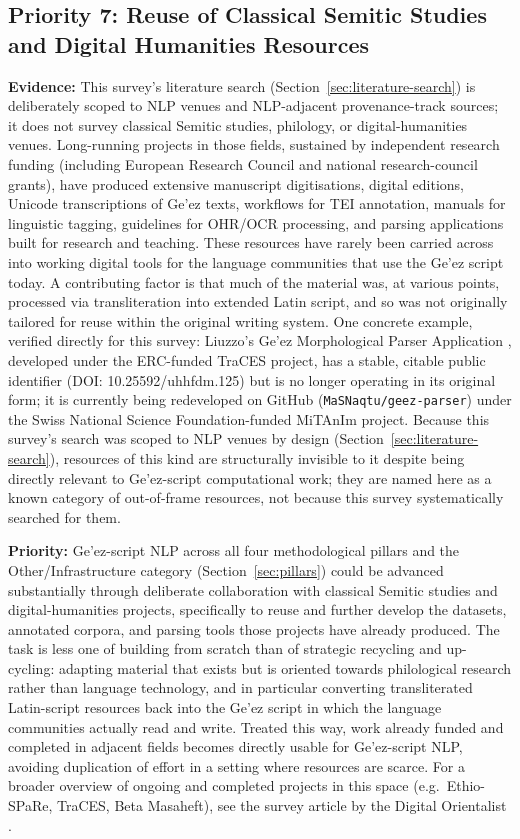 \documentclass[sn-mathphys-num]{sn-jnl}
\theoremstyle{thmstyleone}
\theoremstyle{thmstyletwo}
\theoremstyle{thmstylethree}
\begin{document}
\subsection{Priority 7: Reuse of Classical Semitic Studies and Digital Humanities Resources}

\textbf{Evidence:} This survey's literature search (Section~\ref{sec:literature-search}) is deliberately scoped to NLP venues and NLP-adjacent provenance-track sources; it does not survey classical Semitic studies, philology, or digital-humanities venues. Long-running projects in those fields, sustained by independent research funding (including European Research Council and national research-council grants), have produced extensive manuscript digitisations, digital editions, Unicode transcriptions of Ge'ez texts, workflows for TEI annotation, manuals for linguistic tagging, guidelines for OHR/OCR processing, and parsing applications built for research and teaching. These resources have rarely been carried across into working digital tools for the language communities that use the Ge'ez script today. A contributing factor is that much of the material was, at various points, processed via transliteration into extended Latin script, and so was not originally tailored for reuse within the original writing system. One concrete example, verified directly for this survey: Liuzzo's Ge'ez Morphological Parser Application \citep{liuzzo_geez_2019}, developed under the ERC-funded TraCES project, has a stable, citable public identifier (DOI: 10.25592/uhhfdm.125) but is no longer operating in its original form; it is currently being redeveloped on GitHub (\texttt{MaSNaqtu/geez-parser}) under the Swiss National Science Foundation-funded MiTAnIm project. Because this survey's search was scoped to NLP venues by design (Section~\ref{sec:literature-search}), resources of this kind are structurally invisible to it despite being directly relevant to Ge'ez-script computational work; they are named here as a known category of out-of-frame resources, not because this survey systematically searched for them.

\textbf{Priority:} Ge'ez-script NLP across all four methodological pillars and the Other/Infrastructure category (Section~\ref{sec:pillars}) could be advanced substantially through deliberate collaboration with classical Semitic studies and digital-humanities projects, specifically to reuse and further develop the datasets, annotated corpora, and parsing tools those projects have already produced. The task is less one of building from scratch than of strategic recycling and up-cycling: adapting material that exists but is oriented towards philological research rather than language technology, and in particular converting transliterated Latin-script resources back into the Ge'ez script in which the language communities actually read and write. Treated this way, work already funded and completed in adjacent fields becomes directly usable for Ge'ez-script NLP, avoiding duplication of effort in a setting where resources are scarce. For a broader overview of ongoing and completed projects in this space (e.g.\ Ethio-SPaRe, TraCES, Beta Masaheft), see the survey article by the Digital Orientalist \citep{digitalorientalist2026}.
\end{document}
